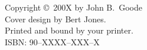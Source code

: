 {\pagestyle{empty}

\clearpage
\par\vskip 2cm
\begin{center}
\par\vspace {2cm}
\fublogo{14cm}
\end{center}

\vfill

%
\noindent%
Copyright \copyright\ 200X by John B.\ Goode\\[2ex] %
Cover design by Bert Jones.\\                       %
Printed and bound by your printer.\\[2ex]           %
ISBN: 90--XXXX--XXX--X                              %


\clearpage
} %

